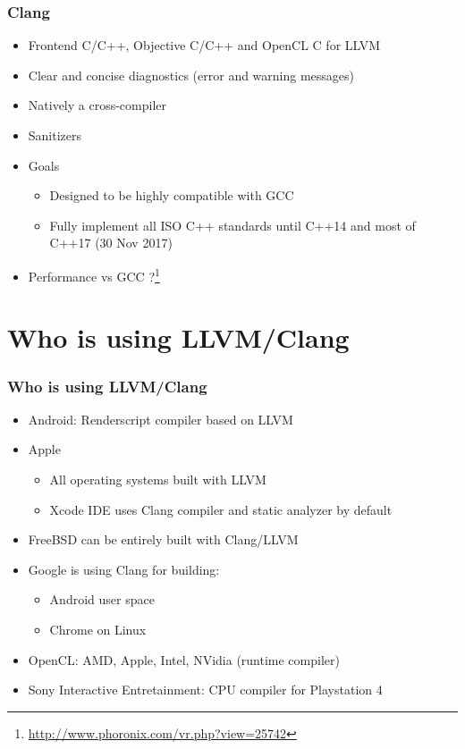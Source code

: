 \documentclass{beamer}
\begin{document}
\begin{frame}
\frametitle{Clang}
\begin{itemize}
  \item Frontend C/C++, Objective C/C++ and OpenCL C for LLVM
  \item Clear and concise diagnostics (error and warning messages)
  \item Natively a cross-compiler
  \item Sanitizers
  \item Goals
  \begin{itemize}
    \item Designed to be highly compatible with GCC
    \item Fully implement all ISO C++ standards until C++14 and most of C++17 (30 Nov 2017)
  \end{itemize}
  \item Performance vs GCC ?\footnote{\url{http://www.phoronix.com/vr.php?view=25742}}
\end{itemize}
\end{frame}
\section{Who is using LLVM/Clang}

\begin{frame}
\frametitle{Who is using LLVM/Clang}
\begin{itemize}
  \item Android: Renderscript compiler based on LLVM
  \item Apple
  \begin{itemize}
    \item All operating systems built with LLVM
    \item Xcode IDE uses Clang compiler and static analyzer by default
  \end{itemize}
  \item FreeBSD can be entirely built with Clang/LLVM
  \item Google is using Clang for building:
  \begin{itemize}
    \item Android user space
    \item Chrome on Linux
  \end{itemize}
  \item OpenCL: AMD, Apple, Intel, NVidia (runtime compiler)
  \item Sony Interactive Entretainment: CPU compiler for Playstation 4
\end{itemize}
\end{frame}
\end{document}
